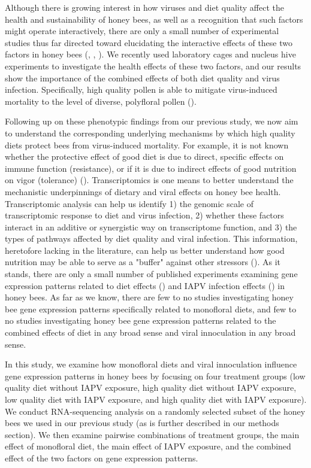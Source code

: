\documentclass[11pt,a4paper,oldfontcommands,openany]{memoir}
\numberwithin{equation}{section} %
\begin{document}
Although there is growing interest in how viruses and diet quality affect the health and sustainability of honey bees, as well as a recognition that such factors might operate interactively, there are only a small number of experimental studies thus far directed toward elucidating the interactive effects of these two factors in honey bees (\citealt{intNV}, \citealt{intNV2}, \citealt{intNV3}). We recently used laboratory cages and nucleus hive experiments to investigate the health effects of these two factors, and our results show the importance of the combined effects of both diet quality and virus infection. Specifically, high quality pollen is able to mitigate virus-induced mortality to the level of diverse, polyfloral pollen (\citealt{adamInt}). 

Following up on these phenotypic findings from our previous study, we now aim to understand the corresponding underlying mechanisms by which high quality diets protect bees from virus-induced mortality. For example, it is not known whether the protective effect of good diet is due to direct, specific effects on immune function (resistance), or if it is due to indirect effects of good nutrition on vigor (tolerance) (\citealt{resTol1}). Transcriptomics is one means to better understand the mechanistic underpinnings of dietary and viral effects on honey bee health. Transcriptomic analysis can help us identify 1) the genomic scale of transcriptomic response to diet and virus infection, 2) whether these factors interact in an additive or synergistic way on transcriptome function, and 3) the types of pathways affected by diet quality and viral infection. This information, heretofore lacking in the literature, can help us better understand how good nutrition may be able to serve as a "buffer" against other stressors (\citealt{AdamTothReview}). As it stands, there are only a small number of published experiments examining gene expression patterns related to diet effects (\citealt{alaux2}) and IAPV infection effects (\citealt{galbraith}) in honey bees. As far as we know, there are few to no studies investigating honey bee gene expression patterns specifically related to monofloral diets, and few to no studies investigating honey bee gene expression patterns related to the combined effects of diet in any broad sense and viral innoculation in any broad sense. 

In this study, we examine how monofloral diets and viral innoculation influence gene expression patterns in honey bees by focusing on four treatment groups (low quality diet without IAPV exposure, high quality diet without IAPV exposure, low quality diet with IAPV exposure, and high quality diet with IAPV exposure). We conduct RNA-sequencing analysis on a randomly selected subset of the honey bees we used in our previous study (as is further described in our methods section). We then examine pairwise combinations of treatment groups, the main effect of monofloral diet, the main effect of IAPV exposure, and the combined effect of the two factors on gene expression patterns.
\end{document}
